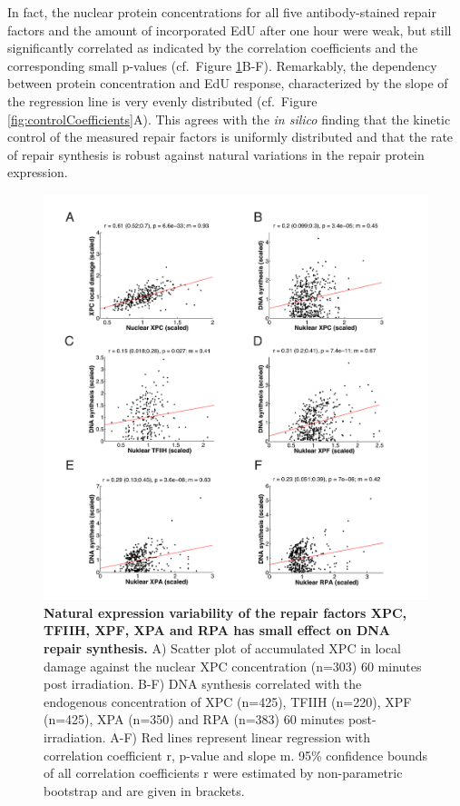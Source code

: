 In fact, the nuclear protein concentrations for all five antibody-stained repair factors and the amount of incorporated EdU after one hour were weak, but still significantly correlated as indicated by the correlation coefficients and the corresponding small p-values (cf.\ Figure \ref{fig:Nuc_vs_DNAsynthesis}B-F). Remarkably, the dependency between protein concentration and EdU response, characterized by the slope of the regression line is very evenly distributed (cf.\ Figure \ref{fig:controlCoefficients}A). This agrees with the \textit{in silico} finding that the kinetic control of the measured repair factors is uniformly distributed and that the rate of repair synthesis is robust against natural variations in the repair protein expression.    

\begin{figure}[htbp]
	\begin{center}
		\includegraphics[width=1\textwidth]{Abbildungen/figure3_3.pdf}
		\caption{\textbf{Natural expression variability of the repair factors XPC, TFIIH, XPF, XPA and RPA has small effect on DNA repair synthesis.} A) Scatter plot of accumulated XPC in local damage against the nuclear XPC concentration (n=303) 60 minutes post irradiation. B-F) DNA synthesis correlated with the endogenous concentration of XPC (n=425), TFIIH (n=220), XPF (n=425), XPA (n=350) and RPA (n=383) 60 minutes post-irradiation. A-F) Red lines represent linear regression with correlation coefficient r, p-value and slope m. 95\% confidence bounds of all correlation coefficients r were estimated by non-parametric bootstrap and are given in brackets. }
		\label{fig:Nuc_vs_DNAsynthesis}
	\end{center}
\end{figure}

